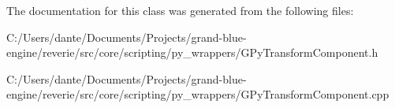 The documentation for this class was generated from the following files\+:\begin{DoxyCompactItemize}
\item 
C\+:/\+Users/dante/\+Documents/\+Projects/grand-\/blue-\/engine/reverie/src/core/scripting/py\+\_\+wrappers/G\+Py\+Transform\+Component.\+h\item 
C\+:/\+Users/dante/\+Documents/\+Projects/grand-\/blue-\/engine/reverie/src/core/scripting/py\+\_\+wrappers/G\+Py\+Transform\+Component.\+cpp\end{DoxyCompactItemize}
